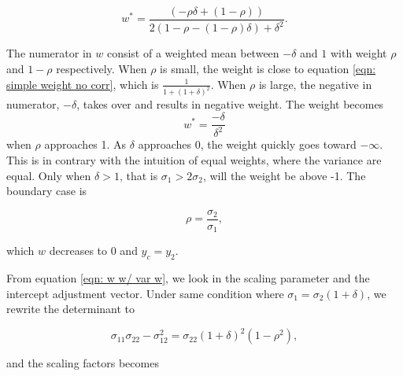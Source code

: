 \documentclass[11pt]{article}
\begin{document}
\begin{equation}
\label{eqn: w high corr}
w^* = \frac{(-\rho\delta+ (1-\rho))}{2(1-\rho - (1-\rho)\delta)+\delta^2}.
\end{equation}

The numerator in \(w\) consist of a weighted
mean between $-\delta$ and $1$ with weight \(\rho\) and $1-\rho$ respectively. When \(\rho\)
is small, the weight is close to equation
\ref{eqn: simple weight no corr}, which is $\frac{1}{1+(1+\delta)^2}$. When \(\rho\) is large, the negative in numerator, \(-\delta\), takes over and results in negative
weight. The weight becomes 
\begin{equation}
\label{eqn: w simple rho 1}
w^* = \frac{-\delta}{\delta^2}
\end{equation}
when $\rho$ approaches 1. As $\delta$ approaches 0, the weight quickly goes toward $-\infty$. This is in contrary with the intuition of equal weights, where the variance are equal.
Only when $\delta >1$, that is $\sigma_1 > 2\sigma_2$, will the weight be above -1.
The boundary case is

\begin{equation}
\label{eqn: corr boundary}
\rho = \frac{\sigma_2}{\sigma_1},
\end{equation}

which \(w\) decreases to \(0\) and \(y_c = y_2\).

From equation \ref{eqn: w w/ var w}, we look in the scaling parameter
and the intercept adjustment vector. Under same condition where
\(\sigma_1 =\sigma_2 (1 + \delta)\), we rewrite the determinant to

\begin{equation}
\sigma_{11}\sigma_{22} - \sigma_{12}^2 = \sigma_{22} (1+\delta)^2 (1- \rho^2),
\end{equation}

and the scaling factors becomes
\end{document}
